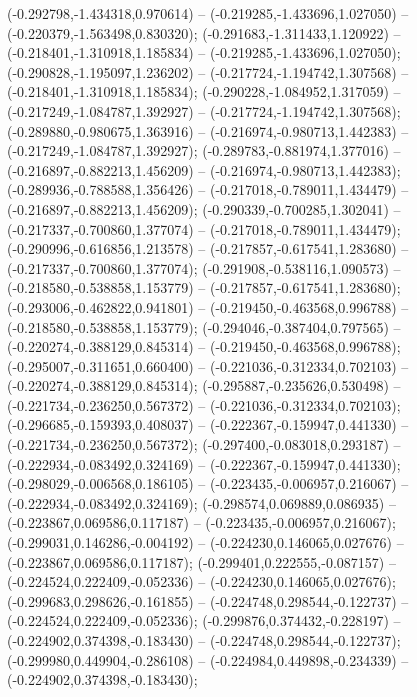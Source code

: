  (-0.292798,-1.434318,0.970614) -- (-0.219285,-1.433696,1.027050) -- (-0.220379,-1.563498,0.830320);
 (-0.291683,-1.311433,1.120922) -- (-0.218401,-1.310918,1.185834) -- (-0.219285,-1.433696,1.027050);
 (-0.290828,-1.195097,1.236202) -- (-0.217724,-1.194742,1.307568) -- (-0.218401,-1.310918,1.185834);
 (-0.290228,-1.084952,1.317059) -- (-0.217249,-1.084787,1.392927) -- (-0.217724,-1.194742,1.307568);
 (-0.289880,-0.980675,1.363916) -- (-0.216974,-0.980713,1.442383) -- (-0.217249,-1.084787,1.392927);
 (-0.289783,-0.881974,1.377016) -- (-0.216897,-0.882213,1.456209) -- (-0.216974,-0.980713,1.442383);
 (-0.289936,-0.788588,1.356426) -- (-0.217018,-0.789011,1.434479) -- (-0.216897,-0.882213,1.456209);
 (-0.290339,-0.700285,1.302041) -- (-0.217337,-0.700860,1.377074) -- (-0.217018,-0.789011,1.434479);
 (-0.290996,-0.616856,1.213578) -- (-0.217857,-0.617541,1.283680) -- (-0.217337,-0.700860,1.377074);
 (-0.291908,-0.538116,1.090573) -- (-0.218580,-0.538858,1.153779) -- (-0.217857,-0.617541,1.283680);
 (-0.293006,-0.462822,0.941801) -- (-0.219450,-0.463568,0.996788) -- (-0.218580,-0.538858,1.153779);
 (-0.294046,-0.387404,0.797565) -- (-0.220274,-0.388129,0.845314) -- (-0.219450,-0.463568,0.996788);
 (-0.295007,-0.311651,0.660400) -- (-0.221036,-0.312334,0.702103) -- (-0.220274,-0.388129,0.845314);
 (-0.295887,-0.235626,0.530498) -- (-0.221734,-0.236250,0.567372) -- (-0.221036,-0.312334,0.702103);
 (-0.296685,-0.159393,0.408037) -- (-0.222367,-0.159947,0.441330) -- (-0.221734,-0.236250,0.567372);
 (-0.297400,-0.083018,0.293187) -- (-0.222934,-0.083492,0.324169) -- (-0.222367,-0.159947,0.441330);
 (-0.298029,-0.006568,0.186105) -- (-0.223435,-0.006957,0.216067) -- (-0.222934,-0.083492,0.324169);
 (-0.298574,0.069889,0.086935) -- (-0.223867,0.069586,0.117187) -- (-0.223435,-0.006957,0.216067);
 (-0.299031,0.146286,-0.004192) -- (-0.224230,0.146065,0.027676) -- (-0.223867,0.069586,0.117187);
 (-0.299401,0.222555,-0.087157) -- (-0.224524,0.222409,-0.052336) -- (-0.224230,0.146065,0.027676);
 (-0.299683,0.298626,-0.161855) -- (-0.224748,0.298544,-0.122737) -- (-0.224524,0.222409,-0.052336);
 (-0.299876,0.374432,-0.228197) -- (-0.224902,0.374398,-0.183430) -- (-0.224748,0.298544,-0.122737);
 (-0.299980,0.449904,-0.286108) -- (-0.224984,0.449898,-0.234339) -- (-0.224902,0.374398,-0.183430);
